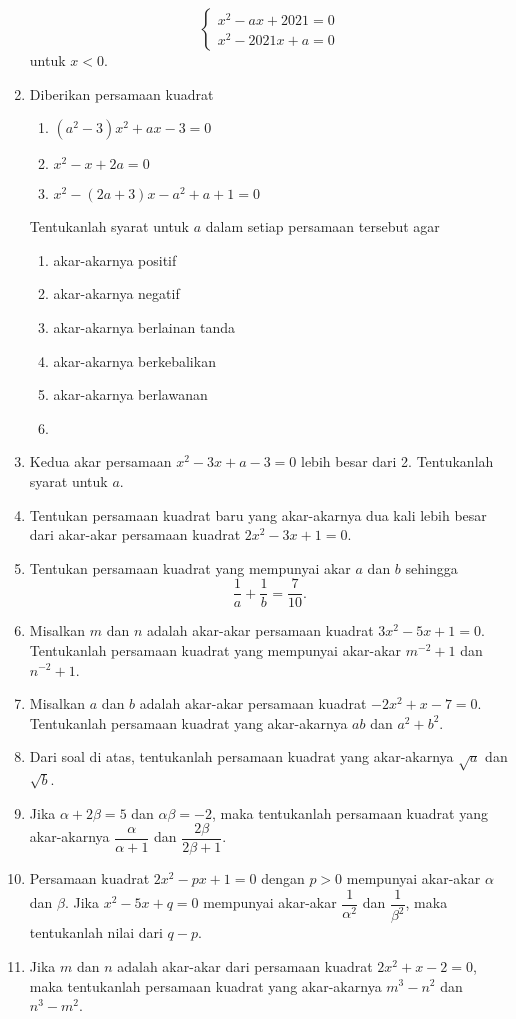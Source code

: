 \begin{enumerate}[nosep]
\[\begin{cases}
					x^{2} - ax + 2021 = 0 \\
					x^{2} - 2021x + a = 0
				\end{cases}
			\]
			untuk $ x < 0 $.
			\item Diberikan persamaan kuadrat
			\begin{enumerate}[label=(\roman*)]
				\item $ \left(a^{2} - 3\right)x^{2} + ax - 3 = 0 $
				\item $ x^{2} - x + 2a = 0 $
				\item $ x^{2} - \left(2a + 3\right)x - a^{2} + a + 1 = 0 $
			\end{enumerate}
			Tentukanlah syarat untuk $ a $ dalam setiap persamaan tersebut agar
			\begin{multcols}
				\begin{enumerate}
					\item akar-akarnya positif
					\item akar-akarnya negatif
					\item akar-akarnya berlainan tanda
					\item akar-akarnya berkebalikan
					\item akar-akarnya berlawanan
					\item[]
				\end{enumerate}
			\end{multcols}
			\item Kedua akar persamaan $ x^{2} - 3x + a - 3 = 0 $ lebih besar dari 2. Tentukanlah syarat untuk $ a $.
			\item Tentukan persamaan kuadrat baru yang akar-akarnya dua kali lebih besar dari akar-akar persamaan kuadrat $ 2x^{2} - 3x + 1 = 0 $.
			\item Tentukan persamaan kuadrat yang mempunyai akar $ a $ dan $ b $ sehingga
			\[ \frac{1}{a} + \frac{1}{b} = \frac{7}{10}. \]
			\item Misalkan $ m $ dan $ n $ adalah akar-akar persamaan kuadrat $ 3x^{2} - 5x + 1 = 0 $. Tentukanlah persamaan kuadrat yang mempunyai akar-akar $ m^{-2} + 1 $ dan $ n^{-2} + 1 $.
			\item Misalkan $ a $ dan $ b $ adalah akar-akar persamaan kuadrat $ -2x^{2} + x - 7 = 0 $. Tentukanlah persamaan kuadrat yang akar-akarnya $ ab $ dan $ a^{2} + b^{2} $.
			\item Dari soal di atas, tentukanlah persamaan kuadrat yang akar-akarnya $ \sqrt{a} $ dan $ \sqrt{b} $.
			\item Jika $ \alpha  + 2\beta = 5 $ dan $ \alpha\beta = -2 $, maka tentukanlah persamaan kuadrat yang akar-akarnya $ \dfrac{\alpha}{\alpha + 1} $ dan $ \dfrac{2\beta}{2\beta + 1} $.
			\item Persamaan kuadrat $ 2x^{2} - px + 1 = 0 $ dengan $ p > 0 $ mempunyai akar-akar $ \alpha $ dan $ \beta $. Jika $ x^{2} - 5x + q = 0 $ mempunyai akar-akar $ \dfrac{1}{\alpha^{2}} $ dan $ \dfrac{1}{\beta^{2}} $, maka tentukanlah nilai dari $ q - p $.
			\item Jika $ m $ dan $ n $ adalah akar-akar dari persamaan kuadrat $ 2x^{2} + x - 2 = 0 $, maka tentukanlah persamaan kuadrat yang akar-akarnya $ m^{3} - n^{2} $ dan $ n^{3} - m^{2} $.
		\end{enumerate}
	
